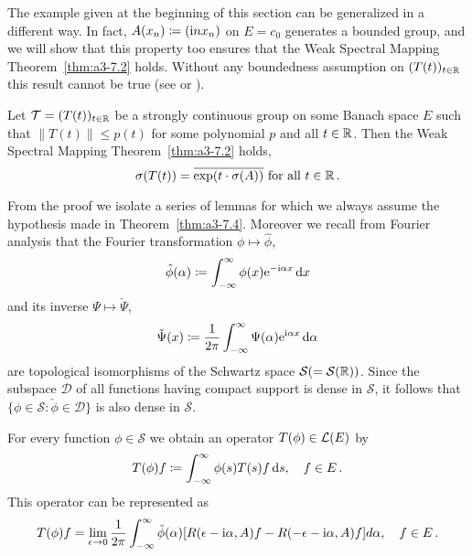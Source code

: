 The example given at the beginning of this section can be generalized in a different way.
In fact, $A(x_{n}) \coloneqq (\mathrm{i} nx_{n})$ on $E = c_{0}$ generates a bounded group, and we will show that this property too ensures that the Weak Spectral Mapping Theorem~\ref{thm:a3-7.2} holds.
Without any boundedness assumption on $(T(t))_{t\in\mathbb{R}}$ this result cannot be true (see \citet[Sec.23.16]{hillephillips:1957} or \citet{wolff:1981}).
\begin{theorem}\label{thm:a3-7.4}
Let $\mathcal{T} = (T(t))_{t\in\mathbb{R}}$ be a strongly continuous group on some Banach space $E$ such that $\|T(t)\| \leq p(t)$ for some polynomial $p$ and all $t \in \mathbb{R}$.
Then the Weak Spectral Mapping Theorem~\ref{thm:a3-7.2} holds, \ie 
\[
\sigma(T(t)) = \overline{\exp(t\cdot\sigma(A))} \text{ for all } t \in \mathbb{R}\,.
\]
\end{theorem}
From the proof we isolate a series of lemmas for which we always assume the hypothesis made in Theorem~\ref{thm:a3-7.4}.
Moreover we recall from Fourier analysis that the Fourier transformation $\phi \mapsto \hat{\phi}$,
\[
\hat{\phi}(\alpha) \coloneqq \int_{-\infty}^{\infty} \phi(x)\mathrm{e}^{-\mathrm{i}\alpha x} \mathop{}\!\mathrm{d}{x}
\]
and its inverse $\Psi \mapsto \check{\Psi}$,
\[
\check{\Psi}(x) \coloneqq \frac{1}{2\pi}\int_{-\infty}^{\infty}\Psi(\alpha)\mathrm{e}^{\mathrm{i}\alpha x} 				\mathop{}\!\mathrm{d}{\alpha}
\]
are topological isomorphisms of the Schwartz space $\mathcal{S} ( = \mathcal{S}(\mathbb{R}))$.
Since the subspace $\mathcal{D}$ of all functions having compact support is dense in $\mathcal{S}$, it follows that $\{\phi \in \mathcal{S} \colon \check{\phi} \in \mathcal{D}\}$ is also dense in $\mathcal{S}$.
\begin{lemma}\label{lem:a3-7.5}
For every function $\phi \in \mathcal{S}$ we obtain an operator $T(\phi) \in \mathcal{L}(E)$ by
\[
T(\phi)f \coloneqq \int_{-\infty}^{\infty} \phi(s)T(s)f \mathop{}\!\mathrm{d}{s}, \quad f \in E\,.
\]
This operator can be represented as
\begin{equation}\label{eq:a3-7.3}
T(\phi)f = \lim_{\epsilon\to 0} \frac{1}{2\pi}\int_{-\infty}^{\infty} \check{\phi}(\alpha)[R(\epsilon-\mathrm{i}\alpha,A)f - R(-\epsilon-\mathrm{i}\alpha,A)f] d\alpha, \quad f \in E\,.
\end{equation}
\end{lemma}
